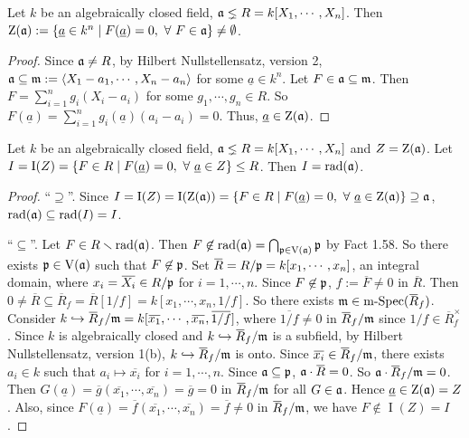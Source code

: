 \begin{theorem}\label{5.43}
    Let $k$ be an algebraically closed field, $\mathfrak{a} \lneq R = k[X_1,\cdots,X_n]$. Then $\operatorname{Z}(\mathfrak{a}) := \{\underline a \in k^{n} \mid F(\underline a) = 0, \ \forall \  F \in \mathfrak{a}\} \neq \emptyset$.
\end{theorem}

\begin{proof}
    Since $\mathfrak{a} \neq R$, by Hilbert Nullstellensatz, version 2, $\mathfrak{a} \subseteq \mathfrak{m} := \langle X_1-a_1,\cdots,X_n-a_n \rangle$ for some $\underline a \in k^{n}$. Let $F \in \mathfrak{a} \subseteq \mathfrak{m}$. Then $F = \sum_{i=1}^{n} g_i(X_i-a_i)$ for some $g_1,\cdots,g_n \in R$. So $F(\underline a) = \sum_{i=1}^{n} g_i(\underline a)(a_i - a_i) = 0$. Thus, $\underline a \in \operatorname{Z}(\mathfrak{a})$.
\end{proof}

\begin{theorem}\label{5.44}
    Let $k$ be an algebraically closed field, $\mathfrak{a} \lneq R = k[X_1,\cdots,X_n]$ and $Z = \operatorname{Z}(\mathfrak{a})$. Let $I = \operatorname{I}(Z) = \{F \in R \mid F(\underline a) = 0, \ \forall \  \underline a \in Z\} \leq R$. Then $I = \operatorname{rad}(\mathfrak{a})$.
\end{theorem}

\begin{proof}
    ``$\supseteq$''.  Since $I = \operatorname{I}(Z) = \operatorname{I}(\operatorname{Z}(\mathfrak{a})) = \{F \in R \mid F(\underline a) = 0, \ \forall \  \underline a \in \operatorname{Z}(\mathfrak{a})\} \supseteq \mathfrak{a}$, $\operatorname{rad}(\mathfrak{a}) \subseteq \operatorname{rad}(I) = I$. \par 
    ``$\subseteq$''. Let $F \in R \smallsetminus \operatorname{rad}(\mathfrak{a})$. Then $F \not \in \operatorname{rad}(\mathfrak{a}) = \bigcap_{\mathfrak{p} \in \operatorname{V}(\mathfrak{a})} \mathfrak{p}$ by Fact 1.58. So there exists $\mathfrak{p} \in \operatorname{V}(\mathfrak{a})$ such that $F \not\in \mathfrak{p}$. Set $\overbar{R} = R/\ffp = k[x_1,\cdots,x_n]$, an integral domain, where $x_i = \overbar{X_i} \in R/\ffp$ for $i = 1,\cdots,n$. Since $F \not\in \mathfrak{p}$, $f := \overbar{F} \neq 0$ in $\overbar{R}$. Then $0 \neq \overbar{R} \subseteq \overbar{R}_f = \overbar{R}[1/f] = k[x_1,\cdots,x_n,1/f]$. So there exists $\ffm \in \operatorname{m-Spec}(\overbar{R}_f)$. Consider $k \hookrightarrow \overbar{R}_f/\ffm = k[\overbar{x_1},\cdots,\overbar{x_n},\overbar{1/f}]$, where $\overbar{1/f} \neq 0$ in $\overbar{R}_f/\ffm$ since $1/f \in \overbar{R}_f^{\times}$. Since $k$ is algebraically closed and $k \hookrightarrow \overbar{R}_f/\ffm$ is a subfield, by Hilbert Nullstellensatz, version 1(b), $k \hookrightarrow \overbar{R}_f/\ffm$ is onto. Since $\overbar{x_i} \in \overbar{R}_f/\ffm$, there exists $a_i \in k$ such that $a_i \mapsto \overbar{x_i}$ for $i = 1,\cdots,n$. Since $\mathfrak{a} \subseteq \mathfrak{p}$, $\ffa \cdot \overbar{R} = 0$. So $\ffa \cdot \overbar{R}_f/\ffm = 0$. Then $G(\underline a) = \overbar{g}(\overbar{x_1},\cdots,\overbar{x_n}) = \overbar{g} = 0$ in $\overbar{R}_f/\ffm$ for all $G \in \mathfrak{a}$. Hence $\underline a \in \operatorname{Z}(\mathfrak{a}) = Z$. Also, since $F(\underline a) = \overbar{f}(\overbar{x_1},\cdots,\overbar{x_n}) = \overbar{f} \neq 0$ in $\overbar{R}_f/\ffm$, we have $F \not\in \operatorname{I}(Z) = I$.
\end{proof}
